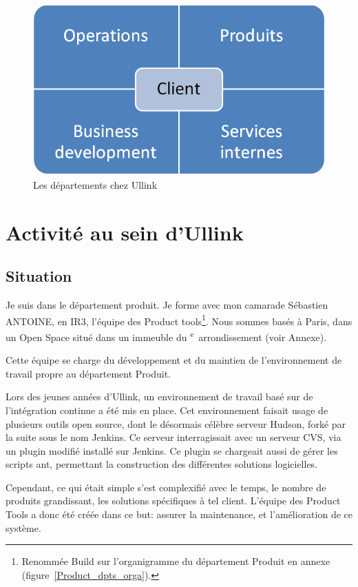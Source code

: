 \documentclass[a4paper, 12pt]{article}
\begin{document}
\begin{figure}
\includegraphics[width=\textwidth]{orga_deps_client.png}
\caption{Les départements chez Ullink}
\label{depts_ullink}
\end{figure}

\section{Activité au sein d'Ullink}

\subsection{Situation}

Je suis dans le département produit. Je forme avec mon camarade Sébastien ANTOINE, en IR3, l'équipe des Product tools\footnote{Renommée Build sur l'organigramme du département Produit en annexe (figure~\ref{Product_dpts_orga}).}. Nous sommes basés à Paris, dans un Open Space situé dans un immeuble du \textsc{}\textsuperscript{e}~arrondissement (voir Annexe).

Cette équipe se charge du développement et du maintien de l'environnement de travail propre au département Produit.

Lors des jeunes années d'Ullink, un environnement de travail basé sur de l'intégration continue a été mis en place. Cet environnement faisait usage de plusieurs outils open source, dont le désormais célèbre serveur Hudson, forké par la suite sous le nom Jenkins. Ce serveur interragissait avec un serveur CVS, via un plugin modifié installé sur Jenkins. Ce plugin se chargeait aussi de gérer les scripts ant, permettant la construction des différentes solutions logicielles.

Cependant, ce qui était simple s'est complexifié avec le temps, le nombre de produits grandissant, les solutions spécifiques à tel client. L'équipe des Product Tools a donc été créée dans ce but: assurer la maintenance, et l'amélioration de ce système.
\end{document}
